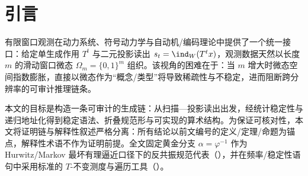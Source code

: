 \section{引言}

有限窗口观测在动力系统、符号动力学与自动机/编码理论中提供了一个统一接口：给定单生成作用 \(T^t\) 与二元投影读出 \(s_t=\ind_W(T^t x)\)，观测数据天然以长度 \(m\) 的滑动窗口微态 \(\Omega_m=\{0,1\}^m\) 组织。该视角的困难在于：当 \(m\) 增大时微态空间指数膨胀，直接以微态作为“概念/类型”将导致稀疏性与不稳定，进而阻断跨分辨率的可审计推理链条。
\par
本文的目标是构造一条可审计的生成链：从扫描—投影读出出发，经统计稳定性与递归地址化得到稳定语法、折叠规范形与可实现的算术结构。为保证可核对性，本文将证明链与解释性叙述严格分离：所有结论以前文编号的定义/定理/命题为锚点，解释性术语不作为证明前提。全文固定黄金分支 \(\alpha=\varphi^{-1}\) 作为 Hurwitz/Markov 最坏有理逼近口径下的反共振规范代表（\cite{Cassels1957,KuipersNiederreiter1974}），并在频率/稳定性语句中采用标准的 \(T\)-不变测度与遍历工具（\cite{WaltersErgodicTheory}）。

